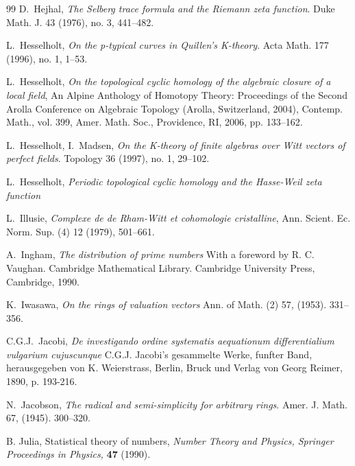 \documentclass[12pt]{article}
\begin{document}
\begin{thebibliography}{99}
 D.~Hejhal, {\em The Selberg trace formula and the Riemann zeta function}. Duke Math. J. 43 (1976), no. 3, 441--482.

 L.~Hesselholt, {\em On the p-typical curves in Quillen's K-theory}. Acta Math. 177 (1996), no. 1, 1--53.


 L.~Hesselholt, {\em On the topological cyclic homology of the algebraic closure of a local field}, An Alpine Anthology of Homotopy Theory: Proceedings of the Second Arolla Conference on Algebraic Topology (Arolla, Switzerland, 2004), Contemp. Math., vol. 399, Amer. Math. Soc., Providence, RI, 2006, pp. 133--162.

 L.~Hesselholt, I.~Madsen, {\em On the K-theory of finite algebras over Witt vectors of perfect fields}. Topology 36 (1997), no. 1, 29--102. 

 L.~Hesselholt, {\em Periodic topological cyclic homology and the Hasse-Weil zeta function} 

   L.~Illusie, {\em Complexe de de Rham-Witt et cohomologie cristalline}, Ann. Scient. Ec. Norm. Sup.
(4) 12 (1979), 501--661.

 A.~Ingham, {\em The distribution of prime numbers} With a foreword by R. C. Vaughan. Cambridge Mathematical Library. Cambridge University Press, Cambridge, 1990. 

   K.~Iwasawa, {\em On the rings of valuation vectors}  Ann. of Math. (2) 57, (1953). 331--356.


 C.G.J.~Jacobi, {\em De investigando ordine systematis aequationum differentialium vulgarium cujuscunque} C.G.J. Jacobi's gesammelte Werke, funfter
Band, herausgegeben von K. Weierstrass, Berlin, Bruck und Verlag von
Georg Reimer, 1890, p. 193-216.

 N.~Jacobson, {\em The radical and semi-simplicity for arbitrary rings}. Amer. J. Math. 67, (1945). 300--320.



\bibitem{[J2]} B. Julia, Statistical theory of numbers, {\it Number Theory and
Physics, Springer Proceedings in Physics,} {\bf 47} (1990).







\end{thebibliography}
\end{document}

